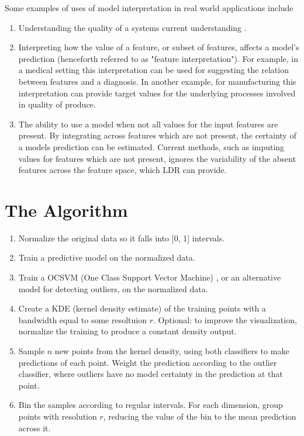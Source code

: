 \documentclass[a4paper, twocolumn]{article}
\begin{document}
Some examples of uses of model interpretation in real world applications include

\begin{enumerate}
\item Understanding the quality of a systems current understanding \cite{end-user-ml}. 

\item Interpreting how the value of a feature, or subset of features, affects a model's prediction (henceforth referred to as "feature interpretation"). For example, in a medical setting this interpretation can be used for suggesting the relation between features and a diagnosis. In another example, for manufacturing this interpretation can provide target values for the underlying processes involved in quality of produce.

\item The ability to use a model when not all values for the input features are present. By integrating across features which are not present, the certainty of a models prediction can be estimated. Current methods, such as imputing values for features which are not present, ignores the variability of the absent features across the feature space, which LDR can provide.
\end{enumerate}

\section{The Algorithm}

\begin{enumerate}
\item Normalize the original data so it falls into [0, 1] intervals.
\item Train a predictive model on the normalized data.
\item Train a OCSVM (One Class Support Vector Machine) \cite{ocsvm}, or an alternative model for detecting outliers, on the normalized data.
\item Create a KDE (kernel density estimate) \cite{kde} of the training points with a bandwidth equal to some resoltuion $r$. Optional: to improve the visualization, normalize the training to produce a constant density output.
\item Sample $n$ new points from the kernel density, using both classifiers to make predictions of each point. Weight the prediction according to the outlier classifier, where outliers have no model certainty in the prediction at that point.
\item Bin the samples according to regular intervals. For each dimension, group points with resolution $r$, reducing the value of the bin to the mean prediction across it.
\end{enumerate}
\end{document}
